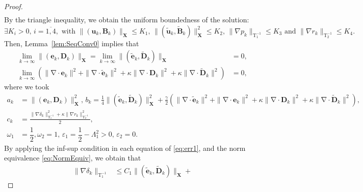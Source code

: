 \documentclass[3p]{elsarticle}
\def\V#1{\mathbf{#1}}
\def\Vt#1{\mathbf{\tilde{#1}}}
\newcommand{\divergence}{\mathrm{\nabla \cdot}}
\newcommand{\Luinvmap}{\mathrm{T_1^{-1}}}
\newcommand{\Lbinvmap}{\mathrm{T_2^{-1}}}
\begin{document}
\begin{proof}
\begin{equation}
\begin{aligned}
\end{aligned}
\end{equation}
By the triangle inequality, we obtain the uniform boundedness of the solution:
\begin{equation}
\label{eq:err9}
\exists K_i>0, \, i=\overline{1,4}, \text{ with } \| (\V{u}_{k},\V{B}_{k}) \|_\V{X} \leq K_1, \, \| (\Vt{u}_{k},\Vt{B}_{k}) \|^2_\V{X} \leq K_2, \, 
\| \nabla p_k \|_{\Luinvmap} \le K_3 \text{ and } \| \nabla r_k \|_{\Lbinvmap} \le K_4.     
\end{equation}
Then, Lemma~\ref{lem:SeqConv0} implies that 
\begin{equation}
    \label{eq:err9.5}
    \begin{aligned}        
    \lim \limits_{k \rightarrow \infty} \| (\V{e}_{k},\V{D}_{k}) \|_\V{X} = \lim \limits_{k \rightarrow \infty} \| (\Vt{e}_{k},\Vt{D}_{k}) \|_\V{X} & = 0, \\ 
    \lim \limits_{k \rightarrow \infty} \left(\|\divergence \V{e}_{k} \|^2+\|\divergence \Vt{e}_{k} \|^2 + \kappa \|\divergence \V{D}_{k} \|^2 + \kappa\|\divergence \Vt{D}_{k} \|^2 \right) & = 0,
    \end{aligned}
\end{equation}
where we took
\begin{equation} \label{eq:err10}  
\begin{aligned}
a_k & = \| (\V{e}_{k},\V{D}_{k}) \|_\V{X}^2, \, b_k = \frac{1}{4}\| (\Vt{e}_{k},\Vt{D}_{k}) \|^2_\V{X}+ \frac{\gamma}{2} \left( \|\divergence \Vt{e}_{k} \|^2 + \|\divergence \V{e}_{k} \|^2 + \kappa \|\divergence \V{D}_{k} \|^2 + \kappa\|\divergence \Vt{D}_{k} \|^2\right), \\
c_k & = \frac{ \|\nabla \delta_{k} \|^2_{\Luinvmap} + \kappa \|\nabla r_{k} \|^2_{\Lbinvmap}}{2}, \\
\omega_1 & = \dfrac{1}{2},  \omega_2=1, \, \varepsilon_1 = \dfrac{1}{2} - \Lambda_1^2>0, \, \varepsilon_2 = 0.
\end{aligned}
\end{equation}
By applying the inf-sup condition in each equation of \eqref{eq:err1}, and the norm equivalence \eqref{eq:NormEquiv}, we obtain that
\begin{equation}
\label{eq:err11}
  \begin{aligned}
   \|\nabla \delta_k\|_{\Luinvmap} & \le C_1 \| (\Vt{e}_k,\Vt{D}_k) \|_{\V{X}} + 

\end{aligned}
\end{equation}
\end{proof}
\end{document}
